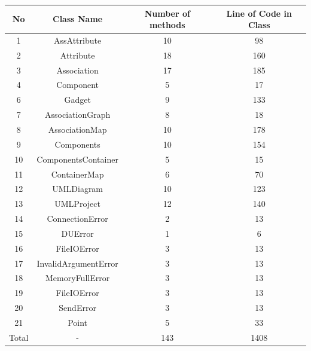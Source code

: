 \documentclass[12pt]{article}
\begin{document}
    \begin{longtable}{|c|c|c|c|}
        \hline
        No    & Class Name           & Number of methods & Line of Code in Class \\
        \hline
        \endfirsthead
        \endhead
        \hline
        1     & AssAttribute         & 10                & 98                    \\
        2     & Attribute            & 18                & 160                   \\
        3     & Association          & 17                & 185                   \\
        4     & Component            & 5                 & 17                    \\
        6     & Gadget               & 9                 & 133                   \\
        7     & AssociationGraph     & 8                 & 18                    \\
        8     & AssociationMap       & 10                & 178                   \\
        9     & Components           & 10                & 154                   \\
        10    & ComponentsContainer  & 5                 & 15                    \\
        11    & ContainerMap         & 6                 & 70                    \\
        12    & UMLDiagram           & 10                & 123                   \\
        13    & UMLProject           & 12                & 140                   \\
        14    & ConnectionError      & 2                 & 13                    \\
        15    & DUError              & 1                 & 6                     \\
        16    & FileIOError          & 3                 & 13                    \\
        17    & InvalidArgumentError & 3                 & 13                    \\
        18    & MemoryFullError      & 3                 & 13                    \\
        19    & FileIOError          & 3                 & 13                    \\
        20    & SendError            & 3                 & 13                    \\
        21    & Point                & 5                 & 33                    \\
        Total & -                    & 143               & 1408                  \\
        \hline
    \end{longtable}
\end{document}
